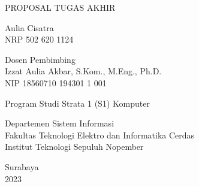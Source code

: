 \begin{large}
  PROPOSAL TUGAS AKHIR 
\end{large}

\vspace{\fill}

\begin{spacing}{1.5}
  \begin{Large}
    \tatitle
  \end{Large}
\end{spacing}

\vspace{\fill}

\begin{large}
  Aulia Cisatra \\
  \textmd{NRP 502 620 1124}
\end{large}

\vspace{\fill}

\begin{large}
  \textmd{Dosen Pembimbing} \\
  Izzat Aulia Akbar, S.Kom., M.Eng., Ph.D. \\
  \textmd{NIP 18560710 194301 1 001} \\
\end{large}

\vspace{\fill}

Program Studi Strata 1 (S1) Komputer \\

\mdseries

Departemen Sistem Informasi \\
Fakultas Teknologi Elektro dan Informatika Cerdas \\
Institut Teknologi Sepuluh Nopember

Surabaya \\
2023
